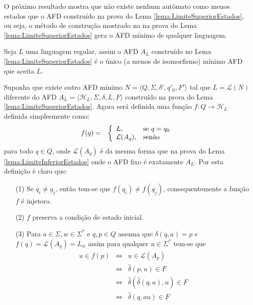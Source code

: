 O próximo resultado mostra que não existe nenhum autômato como menos estados que o AFD construído na prova do Lema \ref{lema:LimiteSuperiorEstados}, ou seja, o método de construção mostrado na  na prova do Lema \ref{lema:LimiteSuperiorEstados} gera o AFD mínimo de qualquer linguagem.

\begin{lema}\label{lema:UnicadadeMinAFD}
	Seja $L$ uma linguagem regular, assim o  AFD $A_L$ construído no Lema \ref{lema:LimiteSuperiorEstados} é o único (a menos de isomorfismo) mínimo AFD que aceita $L$.
\end{lema}

\begin{prova}
	Suponha que existe outro AFD mínimo $N = \langle Q, \Sigma, \delta', q'_0, F' \rangle$ tal que $L = \mathcal{L}(N)$ diferente do AFD $A_L = \langle \mathcal{H}_L, \Sigma, \delta, L, F \rangle$ construído na prova do Lema \ref{lema:LimiteSuperiorEstados}. Agora será definida uma função $f: Q \rightarrow \mathcal{H}_L$ definida simplesmente como: 
	\begin{eqnarray*}
		f(q) & = & \left\{\begin{array}{ll}	L, & \hbox{se } q = q_0\\	\mathcal{L}(A_q),  & \hbox{senão}\end{array}\right.
	\end{eqnarray*}
	para todo $q \in Q$, onde $\mathcal{L}(A_q)$ é da mesma forma que na prova do Lema \ref{lema:LimiteInferiorEstados} onde o AFD fixo é exatamente $A_L$. Por esta definição é claro que: 
	\begin{itemize}
		\item[(1)] Se $q_i \neq q_j$, então tem-se que $f(q_i) \neq f(q_j)$, consequentemente a função $f$ é injetora.
		\item[(2)] $f$ preserva a condição de estado inicial.
		\item[(3)] Para $a \in \Sigma, w \in \Sigma^*$ e $q, p \in Q$ assuma que $\delta(q, a) = p$ e $f(q) = \mathcal{L}(A_q) = L_w$ assim para qualquer $u \in \Sigma^*$ tem-se que
		\begin{eqnarray*}
			u \in f(p) & \Longleftrightarrow & u \in \mathcal{L}(A_p)\\
			& \Longleftrightarrow &  \widehat{\delta}(p, u) \in F\\
			& \Longleftrightarrow &  \widehat{\delta}(\widehat{\delta}(q, a), u) \in F\\
			& \Longleftrightarrow &  \widehat{\delta}(q, au) \in F\\

\end{eqnarray*}
\end{itemize}
\end{prova}
